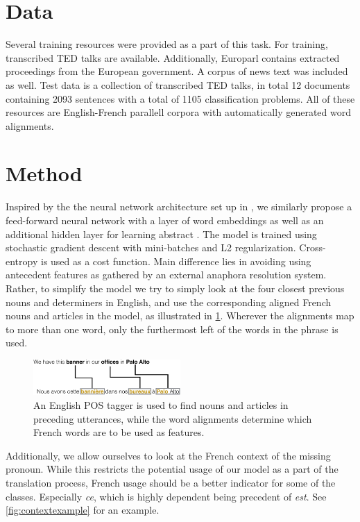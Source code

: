 \documentclass[11pt]{article}
\begin{document}
\section{Data}

Several training resources were provided as a part of this task.
For training, transcribed TED talks are available.
Additionally, Europarl contains extracted proceedings from the European government.
A corpus of news text was included as well. Test data is a collection of transcribed TED talks, in total 12 documents containing 2093 sentences with a total of 1105 classification problems.
All of these resources are English-French parallell corpora with automatically generated word alignments.

\section{Method}

Inspired by the the neural network architecture set up in \cite{Hardmeier2013Latent}, we similarly propose a feed-forward neural network with a layer of word embeddings as well as an additional hidden layer for learning abstract .
The model is trained using stochastic gradient descent with mini-batches and L2 regularization.
Cross-entropy is used as a cost function.
Main difference lies in avoiding using antecedent features as gathered by an external anaphora resolution system.
Rather, to simplify the model we try to simply look at the four closest previous nouns and determiners in English, and use the corresponding aligned French nouns and articles in the model, as illustrated in \cref{fig:posexample}.
Wherever the alignments map to more than one word, only the furthermost left of the words in the phrase is used.

\begin{figure}[htbp]
    \centering
    \includegraphics[width=0.5\textwidth]{figures/posexample.pdf}
    \caption{An English POS tagger is used to find nouns and articles in preceding utterances, while the word alignments determine which French words are to be used as features.}
    \label{fig:posexample}
\end{figure}


Additionally, we allow ourselves to look at the French context of the missing pronoun.
While this restricts the potential usage of our model as a part of the translation process, French usage should be a better indicator for some of the classes.
Especially \emph{ce}, which is highly dependent being precedent of \emph{est}.
See \cref{fig:contextexample} for an example.
\end{document}
